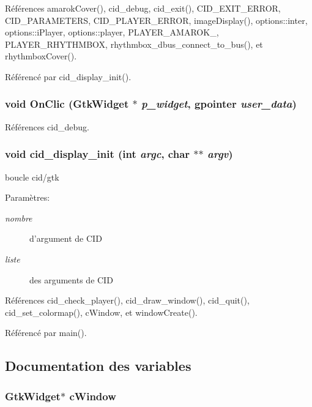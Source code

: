 Références amarokCover(), cid\_\-debug, cid\_\-exit(), CID\_\-EXIT\_\-ERROR, CID\_\-PARAMETERS, CID\_\-PLAYER\_\-ERROR, imageDisplay(), options::inter, options::iPlayer, options::player, PLAYER\_\-AMAROK\_, PLAYER\_\-RHYTHMBOX, rhythmbox\_\-dbus\_\-connect\_\-to\_\-bus(), et rhythmboxCover().

Référencé par cid\_\-display\_\-init().
\subsubsection{\setlength{\rightskip}{0pt plus 5cm}void OnClic (GtkWidget $\ast$ {\em p\_\-widget}, \/  gpointer {\em user\_\-data})}\label{cid-gtk_8c_fee5414c39b8f17f732c412e6f805b2f}




Références cid\_\-debug.
\subsubsection{\setlength{\rightskip}{0pt plus 5cm}void cid\_\-display\_\-init (int {\em argc}, \/  char $\ast$$\ast$ {\em argv})}\label{cid-gtk_8c_6d1ca9236cd558391793807b8e817130}


boucle cid/gtk \begin{Desc}
\item[Paramètres:]
\begin{description}
\item[{\em nombre}]d'argument de CID \item[{\em liste}]des arguments de CID \end{description}
\end{Desc}


Références cid\_\-check\_\-player(), cid\_\-draw\_\-window(), cid\_\-quit(), cid\_\-set\_\-colormap(), cWindow, et windowCreate().

Référencé par main().

\subsection{Documentation des variables}
\subsubsection{\setlength{\rightskip}{0pt plus 5cm}GtkWidget$\ast$ {\bf cWindow}}\label{cid-gtk_8c_0695b426f3104478eec858fb8b5a7b3c}




